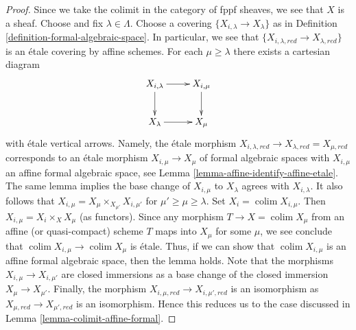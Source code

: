 \documentclass{stacks-project}
\theoremstyle{plain}
\theoremstyle{definition}
\theoremstyle{remark}
\numberwithin{equation}{subsection}
\def\colim{\mathop{\mathrm{colim}}\nolimits}
\begin{document}
\begin{proof}
Since we take the colimit in the category of fppf sheaves, we
see that $X$ is a sheaf. Choose and fix $\lambda \in \Lambda$. Choose
a covering $\{X_{i, \lambda} \to X_\lambda\}$ as in Definition
\ref{definition-formal-algebraic-space}. In particular, we see
that $\{X_{i, \lambda, red} \to X_{\lambda, red}\}$ is an
\'etale covering by affine schemes.
For each $\mu \geq \lambda$ there exists a cartesian diagram
$$
\xymatrix{
X_{i, \lambda} \ar[r] \ar[d] & X_{i, \mu} \ar[d] \\
X_\lambda \ar[r] & X_\mu
}
$$
with \'etale vertical arrows. Namely, the \'etale morphism
$X_{i, \lambda, red} \to X_{\lambda, red} = X_{\mu, red}$
corresponds to an \'etale morphism $X_{i, \mu} \to X_\mu$
of formal algebraic spaces with $X_{i, \mu}$ an affine formal
algebraic space, see
Lemma \ref{lemma-affine-identify-affine-etale}.
The same lemma implies the base change of $X_{i, \mu}$ to $X_\lambda$
agrees with $X_{i, \lambda}$. It also follows that
$X_{i, \mu} = X_\mu \times_{X_{\mu'}} X_{i, \mu'}$ for
$\mu' \geq \mu \geq \lambda$. Set $X_i = \colim X_{i, \mu}$.
Then $X_{i, \mu} = X_i \times_X X_\mu$ (as functors).
Since any morphism $T \to X = \colim X_\mu$
from an affine (or quasi-compact) scheme $T$ maps into $X_\mu$
for some $\mu$, we see conclude that
$\colim X_{i, \mu} \to \colim X_\mu$ is \'etale.
Thus, if we can show that $\colim X_{i, \mu}$ is an affine formal
algebraic space, then the lemma holds.
Note that the morphisms $X_{i, \mu} \to X_{i, \mu'}$
are closed immersions as a base change of the closed immersion
$X_\mu \to X_{\mu'}$. Finally, the morphism
$X_{i, \mu, red} \to X_{i, \mu', red}$ is an isomorphism
as $X_{\mu, red} \to X_{\mu', red}$ is an isomorphism.
Hence this reduces us to the case discussed in
Lemma \ref{lemma-colimit-affine-formal}.
\end{proof}
\end{document}
